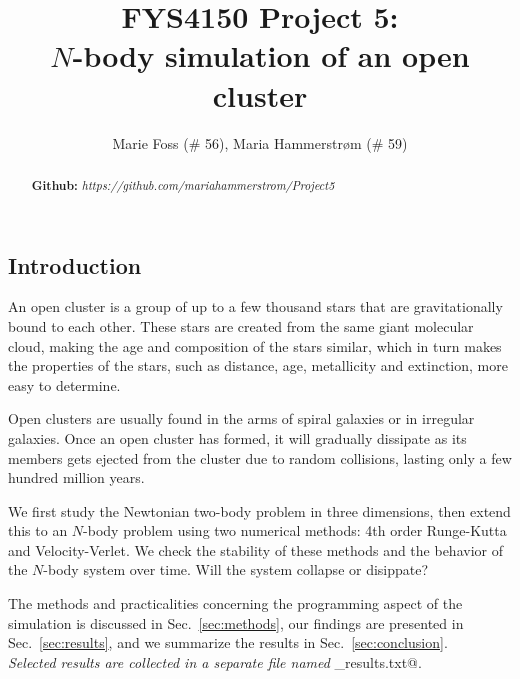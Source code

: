 \documentclass{article}
\title{\textbf{FYS4150 Project 5: \\$N$-body simulation of an open cluster}}
\author{Marie Foss (\# 56), Maria Hammerstr{{\o}}m (\# 59)}
\date{}
\begin{document}
\maketitle

\begin{abstract}
	\noindent \lipsum[1]
	\vspace*{2ex}
	
	\noindent \textbf{Github:} \textit{https://github.com/mariahammerstrom/Project5}
	\vspace*{2ex}
\end{abstract}



\begin{multicols}{2}

\section{Introduction}

An open cluster is a group of up to a few thousand stars that are gravitationally bound to each other. These stars are created from the same giant molecular cloud, making the age and composition of the stars similar, which in turn makes the properties of the stars, such as distance, age, metallicity and extinction, more easy to determine. 

Open clusters are usually found in the arms of spiral galaxies or in irregular galaxies. Once an open cluster has formed, it will gradually dissipate as its members gets ejected from the cluster due to random collisions, lasting only a few hundred million years. 


We first study the Newtonian two-body problem in three dimensions, then extend this to an $N$-body problem using two numerical methods: 4th order Runge-Kutta and Velocity-Verlet. We check the stability of these methods and the behavior of the $N$-body system over time. Will the system collapse or disippate?

The methods and practicalities concerning the programming aspect of the simulation is discussed in Sec.~\ref{sec:methods}, our findings are presented in Sec.~\ref{sec:results}, and we summarize the results in Sec.~\ref{sec:conclusion}. \\

\noindent \textit{Selected results are collected in a separate file named} \verb@selected_results.txt@.




\end{multicols}
\end{document}
